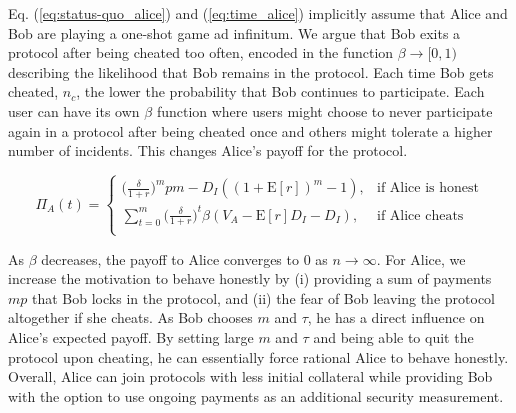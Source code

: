 \documentclass[runningheads]{llncs}
\begin{document}
Eq. (\ref{eq:status-quo_alice}) and (\ref{eq:time_alice}) implicitly assume that Alice and Bob are playing a one-shot game ad infinitum.
We argue that Bob exits a protocol after being cheated too often, encoded in the function $\beta \to [0,1)$ describing the likelihood that Bob remains in the protocol.
Each time Bob gets cheated, $n_c$, the lower the probability that Bob continues to participate.
Each user can have its own $\beta$ function where users might choose to never participate again in a protocol after being cheated once and others might tolerate a higher number of incidents.
This changes Alice's payoff for the protocol.

\begin{equation}
\label{eq:promise_alice}
\Pi_A(t) = 
\begin{cases}
    \big( \frac{\delta}{1+r} \big)^{m} pm - D_{I}((1+\mathrm{E}[r])^{m}-1), & \text{if Alice is honest} \\
    \sum_{t=0}^{m} \big( \frac{\delta}{1+r} \big)^{t} \beta (V_A - \mathrm{E}[r]D_{I}-D_{I}), & \text{if Alice cheats} \\
\end{cases}
\end{equation}



As $\beta$ decreases, the payoff to Alice converges to $0$ as $n \rightarrow \infty$.
For Alice, we increase the motivation to behave honestly by (i) providing a sum of payments $mp$ that Bob locks in the protocol, and (ii) the fear of Bob leaving the protocol altogether if she cheats. %
As Bob chooses $m$ and $\tau$, he has a direct influence on Alice's expected payoff.
By setting large $m$ and $\tau$ and being able to quit the protocol upon cheating, he can essentially force rational Alice to behave honestly.
Overall, Alice can join protocols with less initial collateral while providing Bob with the option to use ongoing payments as an additional security measurement.
\end{document}
